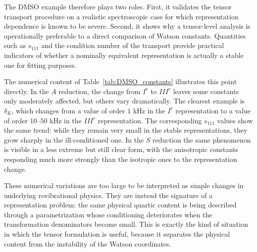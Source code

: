 \documentclass[journal=jacsat,manuscript=article]{achemso}
\begin{document}
The DMSO example therefore plays two roles. First, it validates the tensor
transport procedure on a realistic spectroscopic case for which representation
dependence is known to be severe. Second, it shows why a tensor-level analysis
is operationally preferable to a direct comparison of Watson constants.
Quantities such as $s_{111}$ and the condition number of the transport provide
practical indicators of whether a nominally equivalent representation is
actually a stable one for fitting purposes.

The numerical content of Table~\ref{tab:DMSO_constants} illustrates this point
directly. In the $A$ reduction, the change from $I^r$ to $III^r$ leaves some
constants only moderately affected, but others vary dramatically. The clearest
example is $\delta_K$, which changes from a value of order $1$ kHz in the
$I^r$ representation to a value of order $10$--$50$ kHz in the $III^r$
representation. The corresponding $s_{111}$ values show the same trend: while
they remain very small in the stable representations, they grow sharply in the
ill-conditioned one. In the $S$ reduction the same phenomenon is visible in a
less extreme but still clear form, with the anisotropic constants responding
much more strongly than the isotropic ones to the representation change.

These numerical variations are too large to be interpreted as simple changes
in underlying rovibrational physics. They are instead the signature of a
representation problem: the same physical quartic content is being described
through a parametrization whose conditioning deteriorates when the transformation
denominators become small. This is exactly the kind of situation in which the
tensor formulation is useful, because it separates the physical content from
the instability of the Watson coordinates.
\end{document}

